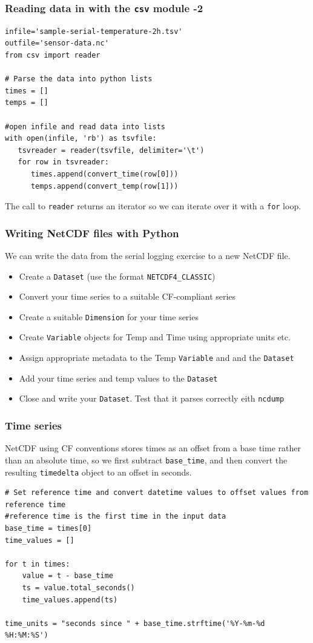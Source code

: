 \documentclass[aspectratio=1610,9pt]{beamer} %
\begin{document}
\begin{frame}[fragile]
\frametitle{Reading data in with the \texttt{csv} module
-2}

\begin{verbatim}
infile='sample-serial-temperature-2h.tsv'
outfile='sensor-data.nc'
from csv import reader

# Parse the data into python lists
times = []
temps = []

#open infile and read data into lists
with open(infile, 'rb') as tsvfile:
   tsvreader = reader(tsvfile, delimiter='\t')
   for row in tsvreader:
      times.append(convert_time(row[0]))
      temps.append(convert_temp(row[1]))
\end{verbatim}

The call to \texttt{reader} returns an iterator so we can iterate over
it with a \texttt{for} loop.

\end{frame}
\begin{frame}
\frametitle{Writing NetCDF files with
Python}

We can write the data from the serial logging exercise to a new NetCDF
file.

\begin{itemize}
\itemsep1pt\parskip0pt
\item
  Create a \texttt{Dataset} (use the format \texttt{NETCDF4\_CLASSIC})
\item
  Convert your time series to a suitable CF-compliant series
\item
  Create a suitable \texttt{Dimension} for your time series
\item
  Create \texttt{Variable} objects for Temp and Time using appropriate
  units etc.
\item
  Assign appropriate metadata to the Temp \texttt{Variable} and and the
  \texttt{Dataset}
\item
  Add your time series and temp values to the \texttt{Dataset}
\item
  Close and write your \texttt{Dataset}. Test that it parses correctly
  eith \texttt{ncdump}
\end{itemize}

\end{frame}
\begin{frame}[fragile]
\frametitle{Time series}

NetCDF using CF conventions stores times as an offset from a base time
rather than an absolute time, so we first subtract \texttt{base\_time},
and then convert the resulting \texttt{timedelta} object to an offset in
seconds.

\begin{verbatim}
# Set reference time and convert datetime values to offset values from reference time
#reference time is the first time in the input data
base_time = times[0]
time_values = []

for t in times:
    value = t - base_time
    ts = value.total_seconds()
    time_values.append(ts)

time_units = "seconds since " + base_time.strftime('%Y-%m-%d %H:%M:%S')
\end{verbatim}

\end{frame}
\end{document}

